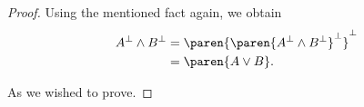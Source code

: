 \begin{proof}
    Using the mentioned fact again, we obtain
    \begin{align}
        A^\perp \wedge B^\perp      &=  \paren{\paren{A^\perp \wedge B^\perp}^\perp}^\perp    \\
                                    &=  \paren{A \vee B}.
    \end{align}\pn
    
    As we wished to prove.
\end{proof}